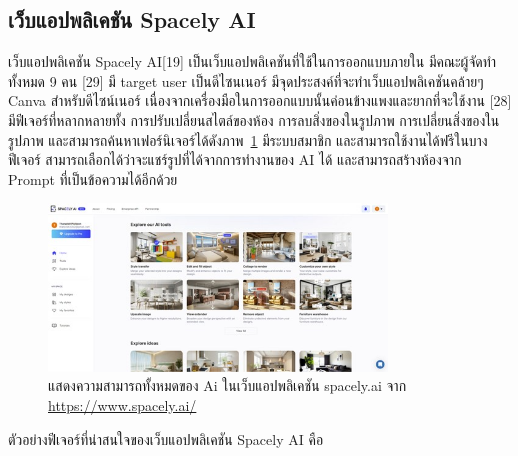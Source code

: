 \documentclass[12pt,oneside,openright,a4paper]{cpe-thai-project}
\begin{document}
\subsection{เว็บแอปพลิเคชัน Spacely AI}
\hspace {18pt} เว็บแอปพลิเคชัน Spacely AI[19] เป็นเว็บแอปพลิเคชันที่ใช้ในการออกแบบภายใน มีคณะผู้จัดทำทั้งหมด 9 คน [29] มี target user เป็นดีไซนเนอร์ มีจุดประสงค์ที่จะทำเว็บแอปพลิเคชันคล้ายๆ Canva สำหรับดีไซน์เนอร์ เนื่องจากเครื่องมือในการออกแบบนั้นค่อนข้างแพงและยากที่จะใช้งาน [28]    มีฟีเจอร์ที่หลากหลายทั้ง การปรับเปลี่ยนสไตล์ของห้อง การลบสิ่งของในรูปภาพ การเปลี่ยนสิ่งของในรูปภาพ และสามารถค้นหาเฟอร์นิเจอร์ได้ดังภาพ~\ref{fig:spacely} มีระบบสมาชิก และสามารถใช้งานได้ฟรีในบางฟีเจอร์ สามารถเลือกได้ว่าจะแชร์รูปที่ได้จากการทำงานของ AI ได้ และสามารถสร้างห้องจาก Prompt ที่เป็นข้อความได้อีกด้วย 

\begin{figure}[!h]\centering
\includegraphics[width=9cm]{image/spacely.jpg}
\caption{แสดงความสามารถทั้งหมดของ Ai ในเว็บแอปพลิเคชัน spacely.ai จาก \url{https://www.spacely.ai/}}
\label{fig:spacely}
\end{figure}

\vspace{\fill}\clearpage

 ตัวอย่างฟีเจอร์ที่น่าสนใจของเว็บแอปพลิเคชัน Spacely AI คือ
\end{document}
